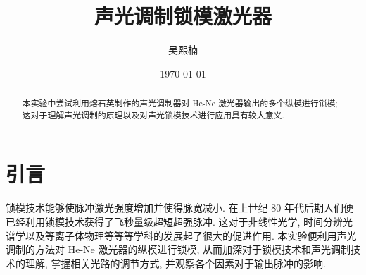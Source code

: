 \documentclass[aps,pre,12pt,preprint,%
	onecolumn,showpacs,showkeys,nofootinbib]{revtex4-2}
\begin{document}
	\title{%
	\texstringonly{\hfil\\[2\baselineskip]}
	\sf\LARGE%
		声光调制锁模激光器%
	\texstringonly{\vspace{3ex}}}
	\author{\fangsong\large%
		吴熙楠%
	\vspace{2mm}}
	\date{\today}
	
\begin{abstract}
\vspace{10mm}
\begin{spacing}{1.5}\normalsize
\setlength{\parskip}{.3\baselineskip}
%	
本实验中尝试利用熔石英制作的声光调制器对 He-Ne 激光器输出的多个纵模进行锁模; 这对于理解声光调制的原理以及对声光锁模技术进行应用具有较大意义.
\end{spacing}
\end{abstract}
\clearpage
\maketitle
\thispagestyle{titlepagestyle}
%

\newpage
\section{引言}
锁模技术能够使脉冲激光强度增加并使得脉宽减小. 在上世纪 80 年代后期人们便已经利用锁模技术获得了飞秒量级超短超强脉冲. 这对于非线性光学, 时间分辨光谱学以及等离子体物理等等等学科的发展起了很大的促进作用. 本实验便利用声光调制的方法对 He-Ne 激光器的纵模进行锁模, 从而加深对于锁模技术和声光调制技术的理解, 掌握相关光路的调节方式, 并观察各个因素对于输出脉冲的影响.
\end{document}
